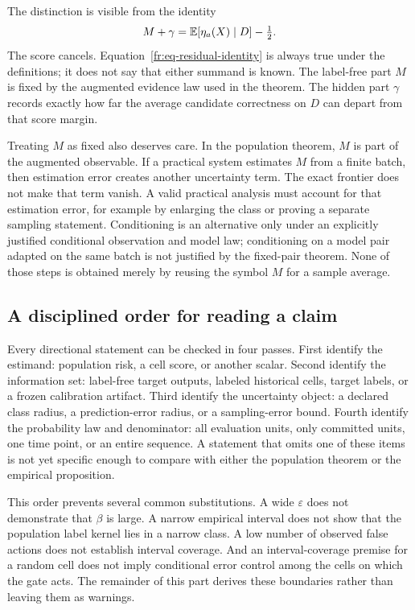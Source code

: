 The distinction is visible from the identity
\begin{equation}
  M+\gamma
  =\mathbb{E}[\eta_a(X)\mid D]-\tfrac12.
  \label{fr:eq-residual-identity}
\end{equation}
The score cancels.  Equation~\eqref{fr:eq-residual-identity} is always true under the definitions;
it does not say that either summand is known.  The label-free part $M$ is fixed by the augmented
evidence law used in the theorem.  The hidden part $\gamma$ records exactly how far the average
candidate correctness on $D$ can depart from that score margin.

Treating $M$ as fixed also deserves care.  In the population theorem, $M$ is part of the augmented
observable.  If a practical system estimates $M$ from a finite batch, then estimation error creates
another uncertainty term.  The exact frontier does not make that term vanish.  A valid practical
analysis must account for that estimation error, for example by enlarging the class or proving a
separate sampling statement.  Conditioning is an alternative only under an explicitly justified
conditional observation and model law; conditioning on a model pair adapted on the same batch is
not justified by the fixed-pair theorem.  None of those steps is obtained merely by reusing the
symbol $M$ for a sample average.

\subsection{A disciplined order for reading a claim}
\label{fr:subsec-claim-order}

Every directional statement can be checked in four passes.  First identify the estimand: population
risk, a cell score, or another scalar.  Second identify the information set: label-free target
outputs, labeled historical cells, target labels, or a frozen calibration artifact.  Third identify
the uncertainty object: a declared class radius, a prediction-error radius, or a sampling-error
bound.  Fourth identify the probability law and denominator: all evaluation units, only committed
units, one time point, or an entire sequence.  A statement that omits one of these items is not yet
specific enough to compare with either the population theorem or the empirical proposition.

This order prevents several common substitutions.  A wide $\varepsilon$ does not demonstrate that
$\beta$ is large.  A narrow empirical interval does not show that the population label kernel lies
in a narrow class.  A low number of observed false actions does not establish interval coverage.
And an interval-coverage premise for a random cell does not imply conditional error control among
the cells on which the gate acts.  The remainder of this part derives these boundaries rather than
leaving them as warnings.

